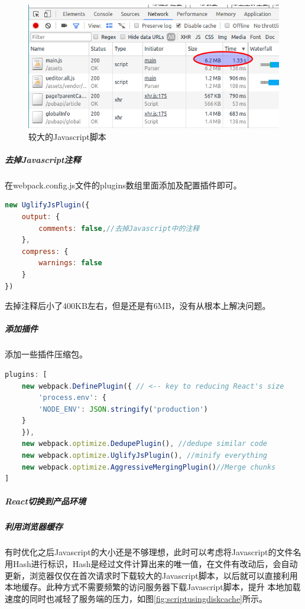 \documentclass[letter]{book}
\begin{document}
\begin{figure}[htbp]
	\centering
	\includegraphics[scale=0.5]{largejavasript.png}
	\caption{较大的Javascript脚本}
	\label{fig:largejavasript}
\end{figure}

\subparagraph{去掉Javascript注释}

在webpack.config.js文件的plugins数组里面添加及配置插件即可。

\begin{lstlisting}[language=Javascript]
new UglifyJsPlugin({
	output: {
		comments: false,//去掉Javascript中的注释
	},
	compress: {
		warnings: false
	}
})
\end{lstlisting}

去掉注释后小了400KB左右，但是还是有6MB，没有从根本上解决问题。

\subparagraph{添加插件}

添加一些插件压缩包。

\begin{lstlisting}[language=Javascript]
plugins: [
	new webpack.DefinePlugin({ // <-- key to reducing React's size
		'process.env': {
		'NODE_ENV': JSON.stringify('production')
	}
	}),
	new webpack.optimize.DedupePlugin(), //dedupe similar code 
	new webpack.optimize.UglifyJsPlugin(), //minify everything
	new webpack.optimize.AggressiveMergingPlugin()//Merge chunks 
]
\end{lstlisting}


\subparagraph{React切换到产品环境}

\subparagraph{利用浏览器缓存}

有时优化之后Javascript的大小还是不够理想，此时可以考虑将Javascript的文件名用Hash进行标识，Hash是经过文件计算出来的唯一值，在文件有改动后，会自动更新，浏览器仅仅在首次请求时下载较大的Javascript脚本，以后就可以直接利用本地缓存。此种方式不需要频繁的访问服务器下载Javascript脚本，提升 本地加载速度的同时也减轻了服务端的压力，如图\ref{fig:scriptusingdiskcache}所示。
\end{document}
